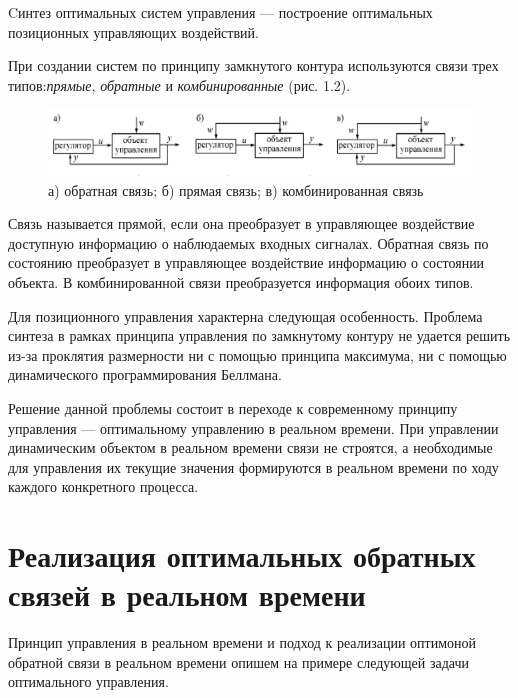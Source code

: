 \begin{definition} 
Cинтез оптимальных систем управления — построение оптимальных позиционных управляющих воздействий.
\end{definition}
При создании систем по принципу замкнутого контура используются связи трех типов:\emph{прямые}, \emph{обратные} и \emph{комбинированные} (рис. 1.2).
\begin{figure}[h]

\centering

\includegraphics[width=\linewidth]{image2.jpg}

\caption{а) обратная связь; б) прямая связь; в) комбинированная связь}

\label{fig:mpr}

\end{figure}

 Связь называется прямой, если она преобразует в управляющее воздействие доступную информацию о наблюдаемых входных сигналах. Обратная связь по состоянию преобразует в управляющее воздействие информацию о состоянии объекта. В комбинированной связи преобразуется информация обоих типов.
 
 Для позиционного управления характерна следующая особенность. Проблема синтеза в рамках принципа управления по замкнутому контуру не удается решить из-за проклятия размерности ни с помощью принципа максимума, ни с помощью динамического программирования Беллмана. 
 
 Решение данной проблемы состоит в переходе к современному принципу управления — оптимальному управлению в реальном времени. При управлении динамическим объектом в реальном времени связи не строятся, а необходимые для управления их текущие значения формируются в реальном времени по ходу каждого конкретного процесса.
 



\section{Реализация оптимальных обратных связей в реальном времени}\label{1sec:Feedback}
Принцип управления в реальном времени и подход к реализации оптимоной обратной связи в реальном времени опишем на примере следующей задачи оптимального управления.

